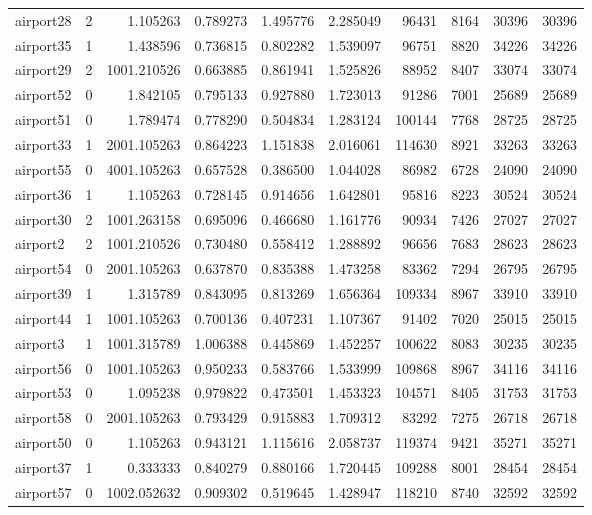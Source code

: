 \begin{longtable}{|l|r|r|r|r|r|r|r|r|r|}
airport28 & 2 & 1.105263 & 0.789273 & 1.495776 & 2.285049 & 96431 & 8164 & 30396 & 30396 \\
airport35 & 1 & 1.438596 & 0.736815 & 0.802282 & 1.539097 & 96751 & 8820 & 34226 & 34226 \\
airport29 & 2 & 1001.210526 & 0.663885 & 0.861941 & 1.525826 & 88952 & 8407 & 33074 & 33074 \\
airport52 & 0 & 1.842105 & 0.795133 & 0.927880 & 1.723013 & 91286 & 7001 & 25689 & 25689 \\
airport51 & 0 & 1.789474 & 0.778290 & 0.504834 & 1.283124 & 100144 & 7768 & 28725 & 28725 \\
airport33 & 1 & 2001.105263 & 0.864223 & 1.151838 & 2.016061 & 114630 & 8921 & 33263 & 33263 \\
airport55 & 0 & 4001.105263 & 0.657528 & 0.386500 & 1.044028 & 86982 & 6728 & 24090 & 24090 \\
airport36 & 1 & 1.105263 & 0.728145 & 0.914656 & 1.642801 & 95816 & 8223 & 30524 & 30524 \\
airport30 & 2 & 1001.263158 & 0.695096 & 0.466680 & 1.161776 & 90934 & 7426 & 27027 & 27027 \\
airport2 & 2 & 1001.210526 & 0.730480 & 0.558412 & 1.288892 & 96656 & 7683 & 28623 & 28623 \\
airport54 & 0 & 2001.105263 & 0.637870 & 0.835388 & 1.473258 & 83362 & 7294 & 26795 & 26795 \\
airport39 & 1 & 1.315789 & 0.843095 & 0.813269 & 1.656364 & 109334 & 8967 & 33910 & 33910 \\
airport44 & 1 & 1001.105263 & 0.700136 & 0.407231 & 1.107367 & 91402 & 7020 & 25015 & 25015 \\
airport3 & 1 & 1001.315789 & 1.006388 & 0.445869 & 1.452257 & 100622 & 8083 & 30235 & 30235 \\
airport56 & 0 & 1001.105263 & 0.950233 & 0.583766 & 1.533999 & 109868 & 8967 & 34116 & 34116 \\
airport53 & 0 & 1.095238 & 0.979822 & 0.473501 & 1.453323 & 104571 & 8405 & 31753 & 31753 \\
airport58 & 0 & 2001.105263 & 0.793429 & 0.915883 & 1.709312 & 83292 & 7275 & 26718 & 26718 \\
airport50 & 0 & 1.105263 & 0.943121 & 1.115616 & 2.058737 & 119374 & 9421 & 35271 & 35271 \\
airport37 & 1 & 0.333333 & 0.840279 & 0.880166 & 1.720445 & 109288 & 8001 & 28454 & 28454 \\
airport57 & 0 & 1002.052632 & 0.909302 & 0.519645 & 1.428947 & 118210 & 8740 & 32592 & 32592 \\

\end{longtable}
